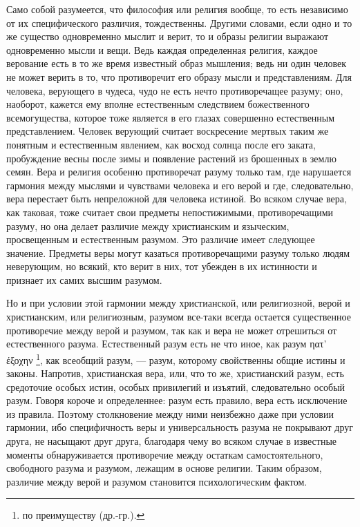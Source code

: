 \documentclass[12pt,oneside]{book}
\newcommand{\textgreek}[1]{
\begingroup\fontencoding{LGR}\selectfont#1\endgroup
}
\begin{document}
Само собой разумеется, что философия или религия вообще, то есть независимо от их специфического различия, тождественны. Другими словами, если одно и то же существо одновременно мыслит и верит, то и образы религии выражают одновременно мысли и вещи. Ведь каждая определенная религия, каждое верование есть в то же время известный образ мышления; ведь ни один человек не может верить в то, что противоречит его образу мысли и представлениям. Для человека, верующего в чудеса, чудо не есть нечто противоречащее разуму; оно, наоборот, кажется ему вполне естественным следствием божественного всемогущества, которое тоже является в его глазах совершенно естественным представлением. Человек верующий считает воскресение мертвых таким же понятным и естественным явлением, как восход солнца после его заката, пробуждение весны после зимы и появление растений из брошенных в землю семян. Вера и религия особенно противоречат разуму только там, где нарушается гармония между мыслями и чувствами человека и его верой и где, следовательно, вера перестает быть непреложной для человека истиной. Во всяком случае вера, как таковая, тоже считает свои предметы непостижимыми, противоречащими разуму, но она делает различие между христианским и языческим, просвещенным и естественным разумом. Это различие имеет следующее значение. Предметы веры могут казаться противоречащими разуму только людям неверующим, но всякий, кто верит в них, тот убежден в их истинности и признает их самих высшим разумом.

Но и при условии этой гармонии между христианской, или религиозной, верой и христианским, или религиозным, разумом все-таки всегда остается существенное противоречие между верой и разумом, так как и вера не может отрешиться от естественного разума. Естественный разум есть не что иное, как разум \textgreek{ηατ' έξοχην}\footnote{по преимуществу (др.-гр.).}, как всеобщий разум, --- разум, которому свойственны общие истины и законы. Напротив, христианская вера, или, что то же, христианский разум, есть средоточие особых истин, особых привилегий и изъятий, следовательно особый разум. Говоря короче и определеннее: разум есть правило, вера есть исключение из правила. Поэтому столкновение между ними неизбежно даже при условии гармонии, ибо специфичность веры и универсальность разума не покрывают друг друга, не насыщают друг друга, благодаря чему во всяком случае в известные моменты обнаруживается противоречие между остаткам самостоятельного, свободного разума и разумом, лежащим в основе религии. Таким образом, различие между верой и разумом становится психологическим фактом.
\end{document}
